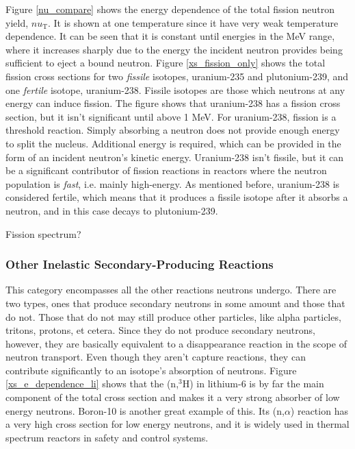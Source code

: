 Figure \ref{nu_compare} shows the energy dependence of the total fission neutron yield, $nu_\mathrm{T}$. It is shown at one temperature since it have very weak temperature dependence.   It can be seen that it is constant until energies in the MeV range, where it increases sharply due to the energy the incident neutron provides being sufficient to eject a bound neutron.  Figure \ref{xs_fission_only} shows the total fission cross sections for two \emph{fissile} isotopes, uranium-235 and plutonium-239, and one \emph{fertile} isotope, uranium-238.  Fissile isotopes are those which neutrons at any energy can induce fission.  The figure shows that uranium-238 has a fission cross section, but it isn't significant until above 1 MeV.  For uranium-238, fission is a threshold reaction.  Simply absorbing a neutron does not provide enough energy to split the nucleus.  Additional energy is required, which can be provided in the form of an incident neutron's kinetic energy.  Uranium-238 isn't fissile, but it can be a significant contributor of fission reactions in reactors where the neutron population is \emph{fast}, i.e. mainly high-energy.  As mentioned before, uranium-238 is considered fertile, which means that it produces a fissile isotope after it absorbs a neutron, and in this case decays to plutonium-239.  

Fission spectrum?

\subsubsection{Other Inelastic Secondary-Producing Reactions}

This category encompasses all the other reactions neutrons undergo.  There are two types, ones that produce secondary neutrons in some amount and those that do not.  Those that do not may still produce other particles, like alpha particles, tritons, protons, et cetera.  Since they do not produce secondary neutrons, however, they are basically equivalent to a disappearance reaction in the scope of neutron transport.  Even though they aren't capture reactions, they can contribute significantly to an isotope's absorption of neutrons.  Figure \ref{xs_e_dependence_li} shows that the (n,$^3$H) in lithium-6 is by far the main component of the total cross section and makes it a very strong absorber of low energy neutrons.  Boron-10 is another great example of this.  Its (n,$\alpha$) reaction has a very high cross section for low energy neutrons, and it is widely used in thermal spectrum reactors in safety and control systems.

